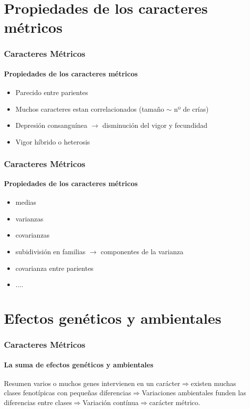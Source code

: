 \documentclass{beamer}
\newenvironment{caja}
{
\begin{beamerboxesrounded}[upper=upcol,lower=lowcol,shadow=true]}
{\end{beamerboxesrounded}}
\begin{document}

\section{Propiedades de los caracteres métricos}


\begin{frame}
\frametitle{Caracteres Métricos}
\framesubtitle{Propiedades de los caracteres métricos}
\begin{itemize}[<+-| alert@+>]
\item Parecido entre parientes
\item Muchos caracteres estan correlacionados (tamaño $\sim$ nº de crías)
\item Depresión consanguínea $\rightarrow$ disminución del vigor y fecundidad
\item Vigor híbrido o heterosis
\end{itemize}
\end{frame}


\begin{frame}
\frametitle{Caracteres Métricos}
\framesubtitle{Propiedades de los caracteres métricos}
\begin{itemize}[<+-| alert@+>]
\item medias
\item varianzas
\item covarianzas
\item subidivisión en familias $\rightarrow$ componentes de la varianza
\item covarianza entre parientes
\item ....
\end{itemize}
\end{frame}


\section{Efectos genéticos y ambientales}

\begin{frame}
\frametitle{Caracteres Métricos}
\framesubtitle{La suma de efectos genéticos y ambientales}
\begin{caja}{Resumen}
varios o muchos genes intervienen en un carácter$\Rightarrow$existen muchas clases fenotípicas con pequeñas diferencias$\Rightarrow$Variaciones ambientales funden las diferencias entre clases$\Rightarrow$Variación contínua$\Rightarrow$carácter métrico.
\end{caja}
\end{frame}
\end{document}
